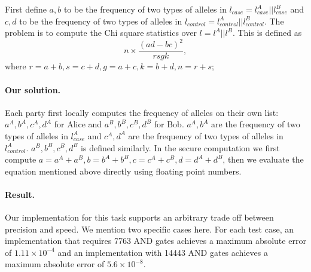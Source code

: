 First define $a, b$ to be the frequency of two types of alleles in
$l_{case} = l^A_{case} || l^B_{case}$ and $c, d$ to be the frequency of two types of alleles in
$l_{control} = l^A_{control} || l^B_{control}$. The problem is to compute the Chi square statistics over $l = l^A||l^B$. This is defined as 
$$n\times\frac{(ad-bc)^2}{rsgk},$$
where $r = a + b, s = c + d, g = a + c, k = b + d, n =  r + s$; 


\paragraph{Our solution.}
Each party first locally computes the frequency of alleles on their own list: $a^A,b^A,c^A,d^A$ for Alice
and $a^B,b^B,c^B,d^B$ for Bob. $a^A,b^A$ are the frequency of two types of alleles in $l^A_{case}$ and 
$c^A,d^A$ are the frequency of two types of alleles in $l^A_{control}$. $a^B,b^B,c^B,d^B$  is defined similarly.
In the secure computation we first compute $a = a^A + a^B, b = b^A + b^B,
c = c^A + c^B,d = d^A + d^B$, then we evaluate the equation mentioned above directly using floating point
numbers.

\paragraph{Result.}
Our implementation for this task supports an arbitrary 
trade off between precision and speed. We mention two specific cases here.
For each test case, an implementation that requires 7763 AND gates achieves a maximum absolute error of $1.11\times10^{-4}$
 and an implementation with 14443 AND gates achieves a maximum absolute error of $5.6\times10^{-8}$.

